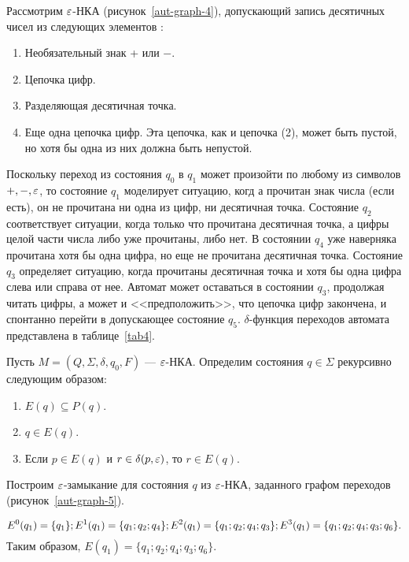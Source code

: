 \begin{myexample}
Рассмотрим $\varepsilon$-НКА (рисунок~\ref{aut-graph-4}), допускающий запись десятичных чисел из следующих элементов $\colon$
\begin{enumerate}
   \item Необязательный знак + или $-$.
   \item Цепочка цифр.
   \item Разделяющая десятичная точка.
   \item Еще одна цепочка цифр. Эта цепочка, как и цепочка (2), может быть пустой, но хотя бы одна из них должна быть непустой.
\end{enumerate}


Поскольку переход из состояния $q_0$ в $q_1$ может произойти по любому из символов $+, -, \varepsilon$, то состояние $q_1$ моделирует ситуацию, когд а прочитан знак числа (если есть), он не прочитана ни одна из цифр, ни десятичная точка. Состояние $q_2$ соответствует ситуации, когда только что прочитана десятичная точка, а цифры целой части числа либо уже прочитаны, либо нет. В состоянии $q_4$ уже наверняка прочитана хотя бы одна цифра, но еще не прочитана десятичная точка. Состояние $q_3$ определяет ситуацию, когда  прочитаны десятичная точка и хотя бы одна цифра слева или справа от нее. Автомат может оставаться в состоянии $q_3$, продолжая читать цифры, а может и <<предположить>>, что цепочка цифр закончена, и спонтанно перейти в допускающее состояние $q_5$.
$\delta$-функция переходов автомата представлена в таблице~\ref{tab4}.

\end{myexample}

Пусть $M = (Q,\Sigma, \delta, q_0, F)$ --- $\varepsilon$-НКА. Определим  состояния $q \in \Sigma$ рекурсивно следующим образом:
\begin{enumerate}
   \item $E(q) \subseteq P(q)$.
   \item $q \in E(q)$.
   \item Если $p \in E(q)$ и $r \in \delta(p, \varepsilon)$, то $r \in E(q)$.
\end{enumerate}

\begin{myexample}
\label{example-413}
Построим $\varepsilon$-замыкание для состояния $q$ из $\varepsilon$-НКА, заданного графом переходов (рисунок~\ref{aut-graph-5}).

\[
	  E^0(q_1) = \{q_1\}; \\
    E^1(q_1) = \{ q_1; q_2; q_4 \}; \\
    E^2(q_1) = \{ q_1; q_2; q_4; q_3 \}; \\
    E^3(q_1) = \{ q_1; q_2; q_4; q_3; q_6 \}. \\
\]
Таким образом, $E(q_1) = \{ q_1; q_2; q_4; q_3; q_6 \} $.
\end{myexample}

